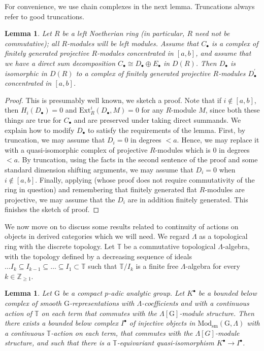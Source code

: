 \documentclass{amsart}
\newtheorem{lemma}[subsubsection]{Lemma}
\theoremstyle{remark}
\numberwithin{equation}{subsection}
\newcommand{\Z}{\ZZ}
\newcommand{\ZZ}{{\mathbb Z}}
\renewcommand{\(}{\left(}
\renewcommand{\)}{\right)}
\begin{document}
For convenience, we use chain complexes in the next lemma. Truncations always refer to good truncations.

\begin{lemma}\label{direct summands of perfect complexes}
Let $R$ be a left Noetherian ring (in particular, $R$ need not be commutative); all $R$-modules will be left modules. Assume that $C_\bullet$ is a complex of finitely generated projective $R$-modules concentrated in $[a,b]$, and assume that we have a direct sum decomposition $C_\bullet \cong D_\bullet \oplus E_\bullet$ in $D(R)$. Then $D_\bullet$ is isomorphic in $D(R)$ to a complex of finitely generated projective $R$-modules $D_\bullet^{\prime}$ concentrated in $[a,b]$.
\end{lemma}

\begin{proof}
This is presumably well known, we sketch a proof. Note that if $i\notin [a,b]$, then $H_i(D_\bullet)=0$ and $\mathrm{Ext}_R^i(D_\bullet, M)=0$ for any $R$-module $M$, since both these things are true for $C_\bullet$ and are preserved under taking direct summands. We explain how to modify $D_\bullet$ to satisfy the requirements of the lemma. First, by truncation, we may assume that $D_i=0$ in degrees $<a$. Hence, we may replace it with a quasi-isomorphic complex of projective $R$-modules which is $0$ in degrees $<a$. By truncation, using the facts in the second sentence of the proof and some standard dimension shifting arguments, we may assume that $D_i = 0$ when $i \notin [a,b]$. Finally, applying \cite[Chapter II, \S 5, Lemma 1]{mumford} (whose proof does not require commutativity of the ring in question) and remembering that finitely generated flat $R$-modules are projective, we may assume that the $D_i$ are in addition finitely generated. This finishes the sketch of proof.
\end{proof}

\medskip

We now move on to discuss some results related to continuity of actions on objects in derived categories which we will need. We regard $\Lambda$ as a topological ring with the discrete topology. Let $\mathbb{T}$ be a commutative topological $\Lambda$-algebra, with the topology defined by a decreasing sequence of ideals $\dots I_k\subseteq I_{k-1}\subseteq \dots \subseteq I_1\subset \mathbb{T}$ such that $\mathbb{T}/I_k$ is a finite free $\Lambda$-algebra for every $k\in \Z_{\geq 1}$.

\begin{lemma}\label{injective resolution with continuous action}  Let $\mathrm{G}$ be a compact $p$-adic analytic group.
Let $K^\bullet$ be a bounded below complex of smooth $\mathrm{G}$-representations with $\Lambda$-coefficients and with a continuous action of $\mathbb{T}$ on each term that commutes with the $\Lambda[\mathrm{G}]$-module structure. Then there exists a bounded below complex $I^\bullet$ of injective objects in $\mathrm{Mod}_{\mathrm{sm}}(\mathrm{G},\Lambda)$ with a continuous $\mathbb{T}$-action on each term, that commutes with the $\Lambda[G]$-module structure, and such that there is a $\mathbb{T}$-equivariant quasi-isomorphism $K^\bullet \to I^\bullet$.
\end{lemma}
\end{document}
